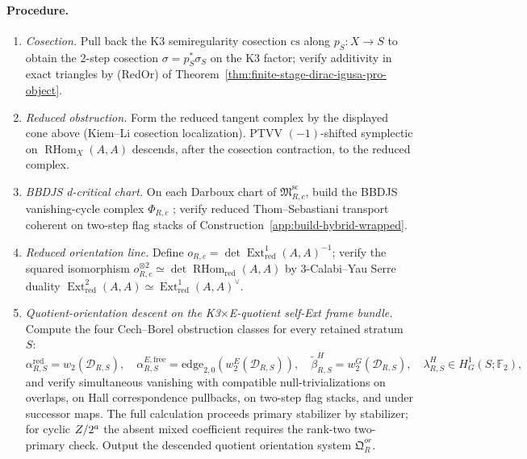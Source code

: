 \paragraph{Procedure.}
\begin{enumerate}
\item \emph{Cosection.}  Pull back the K3 semiregularity cosection
\(\mathrm{cs}\) along \(p_S:X\to S\) to obtain the 2-step cosection
\(\sigma=p_S^*\sigma_S\) on the K3 factor; verify additivity in exact
triangles by \textup{(RedOr)} of
Theorem~\ref{thm:finite-stage-dirac-igusa-pro-object}.

\item \emph{Reduced obstruction.}  Form the reduced tangent complex by
the displayed cone above (Kiem--Li cosection localization).  PTVV
\cite{PTVV2013} \((-1)\)-shifted symplectic on
\(\operatorname{RHom}_X(A,A)\) descends, after the cosection
contraction, to the reduced complex.

\item \emph{BBDJS d-critical chart.}  On each Darboux chart of
\(\mathfrak M^{\mathrm{sc}}_{R,c}\), build the BBDJS vanishing-cycle
complex \(\Phi_{R,c}\) \cite{BBDJS2015}; verify reduced
Thom--Sebastiani transport coherent on two-step flag stacks of
Construction~\ref{app:build-hybrid-wrapped}.

\item \emph{Reduced orientation line.}  Define
\(o_{R,c}=\det\operatorname{Ext}^1_{\mathrm{red}}(A,A)^{-1}\); verify
the squared isomorphism
\(o_{R,c}^{\otimes 2}\simeq\det\operatorname{RHom}_{\mathrm{red}}(A,A)\)
by \(3\)-Calabi--Yau Serre duality
\(\operatorname{Ext}^2_{\mathrm{red}}(A,A)
\simeq\operatorname{Ext}^1_{\mathrm{red}}(A,A)^\vee\).

\item \emph{Quotient-orientation descent on the K3\(\times\)E-quotient
self-Ext frame bundle.}  Compute the four Cech--Borel obstruction
classes for every retained stratum \(S\):
\[
\alpha^{\mathrm{red}}_{R,S}=w_2(\mathscr D_{R,S}),
\quad
\alpha^{E,\mathrm{free}}_{R,S}=
\mathrm{edge}_{2,0}(w_2^E(\mathscr D_{R,S})),
\quad
\widetilde\beta^H_{R,S}=w_2^G(\mathscr D_{R,S}),
\quad
\lambda^H_{R,S}\in H^1_G(S;\mathbb F_2),
\]
and verify simultaneous vanishing with compatible
null-trivializations on overlaps, on Hall correspondence pullbacks,
on two-step flag stacks, and under successor maps.  The full
calculation proceeds primary stabilizer by stabilizer; for cyclic
\(Z/2^a\) the absent mixed coefficient requires the rank-two
two-primary check.  Output the descended quotient orientation system
\(\mathfrak Q^{or}_R\).


\end{enumerate}
